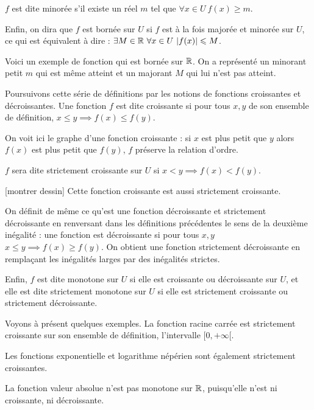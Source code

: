 \change
$f$ est dite minorée s'il existe un réel $m$ tel que $ \forall x\in U \ f(x)\geq m$.

\change
Enfin, on dira que $f$ est bornée sur $U$ si $f$ est à la fois majorée et 
minorée sur $U$, ce qui est équivalent à dire :
$\exists M\in\mathbb{R} \ \forall x\in U \ |f(x)|\leqslant M$.

\change
Voici un exemple de fonction qui est bornée sur $\mathbb{R}$. On a représenté 
un minorant petit $m$ qui est même atteint
et un majorant $M$ qui lui n'est pas atteint.


\diapo
Poursuivons cette série de définitions par les notions de fonctions croissantes et décroissantes. Une fonction $f$ est dite croissante si pour tous $x, y$ de son ensemble de définition, $x\leq y \implies f(x)\leq f(y)$.
 
\change
On voit ici le graphe d'une fonction croissante : si $x$ est plus petit que $y$ alors $f(x)$ est plus petit que $f(y)$, $f$ préserve la relation d'ordre.

\change
$f$ sera dite strictement croissante sur $U$ si $x< y \implies f(x)< f(y)$.

[montrer dessin] 
Cette fonction croissante est aussi strictement croissante.


\diapo
On définit de même ce qu'est une fonction décroissante et strictement décroissante en renversant dans les définitions précédentes le sens de la deuxième inégalité : une fonction est décroissante si pour tous $x,y$ \ $x\leq y \implies f(x)\geq f(y)$. On obtient une fonction strictement décroissante en remplaçant les inégalités larges par des inégalités strictes.
 
\change
Enfin, $f$ est dite monotone sur $U$ si elle est croissante ou décroissante sur $U$, et elle est dite strictement monotone sur $U$ si elle est strictement croissante ou strictement décroissante.


\diapo
Voyons à présent quelques exemples. La fonction racine carrée est strictement croissante sur son ensemble de définition, l'intervalle $[0,+\infty[$.
 
\change
Les fonctions exponentielle et logarithme népérien sont également strictement croissantes.

\change
La fonction valeur absolue n'est pas monotone sur $\mathbb{R}$, puisqu'elle n'est ni croissante, ni décroissante. 

